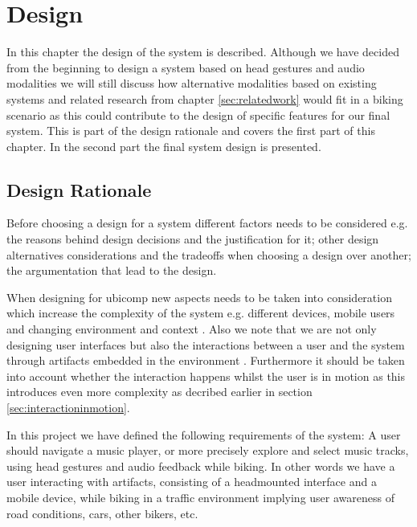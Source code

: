 \chapter{Design}
\label{sec:design}
In this chapter the design of the system is described. Although we have decided from the beginning to design a system based on head gestures and audio modalities we will still discuss how alternative modalities based on existing systems and related research from chapter \ref{sec:relatedwork} would fit in a biking scenario as this could contribute to the design of specific features for our final system. This is part of the design rationale and covers the first part of this chapter. In the second part the final system design is presented.


\section{Design Rationale}


Before choosing a design for a system different factors needs to be considered e.g. the reasons behind design decisions and the justification for it; other design alternatives considerations and the tradeoffs when choosing a design over another; the argumentation that lead to the design.

When designing for ubicomp new aspects needs to be taken into consideration which increase the complexity of the system e.g. different devices, mobile users and changing environment and context \cite{barfield_fundamentals_2000}. Also we note that we are not only designing user interfaces but also the interactions between a user and the system through artifacts embedded in the environment \cite{beaudouin-lafon_designing_2004}. Furthermore it should be taken into account whether the interaction happens whilst the user is in motion as this introduces even more complexity as decribed earlier in section \ref{sec:interactioninmotion}.

In this project we have defined the following requirements of the system: A user should navigate a music player, or more precisely explore and select music tracks, using head gestures and audio feedback while biking. In other words we have a user interacting with artifacts, consisting of a headmounted interface and a mobile device, while biking in a traffic environment implying user awareness of road conditions, cars, other bikers, etc.

